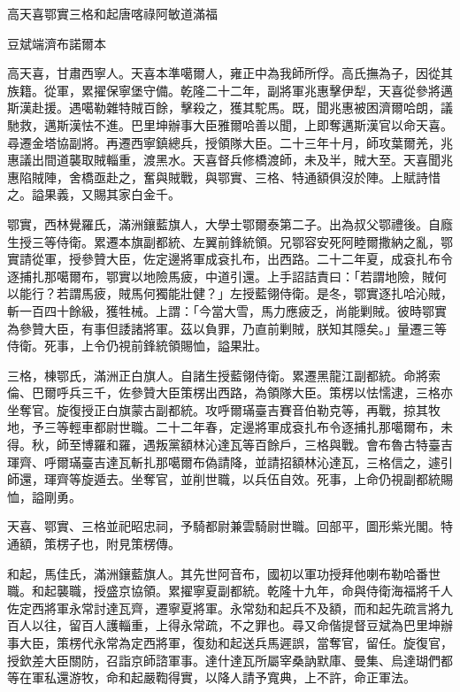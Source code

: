 
\begin{pinyinscope}
高天喜鄂實三格和起唐喀祿阿敏道滿福

豆斌端濟布諾爾本

高天喜，甘肅西寧人。天喜本準噶爾人，雍正中為我師所俘。高氏撫為子，因從其族籍。從軍，累擢保寧堡守備。乾隆二十二年，副將軍兆惠擊伊犁，天喜從參將邁斯漢赴援。遇噶勒雜特賊百餘，擊殺之，獲其駝馬。既，聞兆惠被困濟爾哈朗，議馳救，邁斯漢怯不進。巴里坤辦事大臣雅爾哈善以聞，上即奪邁斯漢官以命天喜。尋遷金塔協副將。再遷西寧鎮總兵，授領隊大臣。二十三年十月，師攻葉爾羌，兆惠議出間道襲取賊輜重，渡黑水。天喜督兵修橋渡師，未及半，賊大至。天喜聞兆惠陷賊陣，舍橋亟赴之，奮與賊戰，與鄂實、三格、特通額俱沒於陣。上賦詩惜之。謚果義，又賜其家白金千。

鄂實，西林覺羅氏，滿洲鑲藍旗人，大學士鄂爾泰第二子。出為叔父鄂禮後。自廕生授三等侍衛。累遷本旗副都統、左翼前鋒統領。兄鄂容安死阿睦爾撒納之亂，鄂實請從軍，授參贊大臣，佐定邊將軍成袞扎布，出西路。二十二年夏，成袞扎布令逐捕扎那噶爾布，鄂實以地險馬疲，中道引還。上手詔詰責曰：「若謂地險，賊何以能行？若謂馬疲，賊馬何獨能壯健？」左授藍翎侍衛。是冬，鄂實逐扎哈沁賊，斬一百四十餘級，獲牲械。上謂：「今當大雪，馬力應疲乏，尚能剿賊。彼時鄂實為參贊大臣，有事但諉諸將軍。茲以負罪，乃直前剿賊，朕知其隱矣。」量遷三等侍衛。死事，上令仍視前鋒統領賜恤，謚果壯。

三格，棟鄂氏，滿洲正白旗人。自諸生授藍翎侍衛。累遷黑龍江副都統。命將索倫、巴爾呼兵三千，佐參贊大臣策楞出西路，為領隊大臣。策楞以怯懦逮，三格亦坐奪官。旋復授正白旗蒙古副都統。攻呼爾璊臺吉賽音伯勒克等，再戰，掠其牧地，予三等輕車都尉世職。二十二年春，定邊將軍成袞扎布令逐捕扎那噶爾布，未得。秋，師至博羅和羅，遇叛黨額林沁達瓦等百餘戶，三格與戰。會布魯古特臺吉琿齊、呼爾璊臺吉達瓦斬扎那噶爾布偽請降，並請招額林沁達瓦，三格信之，遽引師還，琿齊等旋遁去。坐奪官，並削世職，以兵伍自效。死事，上命仍視副都統賜恤，謚剛勇。

天喜、鄂實、三格並祀昭忠祠，予騎都尉兼雲騎尉世職。回部平，圖形紫光閣。特通額，策楞子也，附見策楞傳。

和起，馬佳氏，滿洲鑲藍旗人。其先世阿音布，國初以軍功授拜他喇布勒哈番世職。和起襲職，授盛京協領。累擢寧夏副都統。乾隆十九年，命與侍衛海福將千人佐定西將軍永常討達瓦齊，遷寧夏將軍。永常劾和起兵不及額，而和起先疏言將九百人以往，留百人護輜重，上得永常疏，不之罪也。尋又命偕提督豆斌為巴里坤辦事大臣，策楞代永常為定西將軍，復劾和起送兵馬遲誤，當奪官，留任。旋復官，授欽差大臣關防，召詣京師諮軍事。達什達瓦所屬宰桑訥默庫、曼集、烏達瑚們都等在軍私還游牧，命和起嚴鞫得實，以降人請予寬典，上不許，命正軍法。


\end{pinyinscope}
